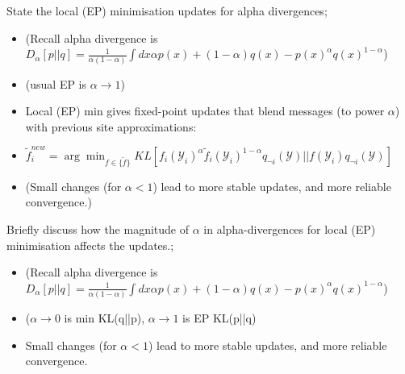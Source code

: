 \documentclass{article}
\begin{document}
State the local (EP) minimisation updates for alpha divergences; \begin{itemize}
    \item (Recall alpha divergence is $D_{\alpha}[p||q] = \frac{1}{\alpha(1-\alpha)}\int dx \alpha p(x) + (1-\alpha)q(x) - p(x)^{\alpha}q(x)^{1-\alpha}$)
    \item (usual EP is $\alpha\rightarrow 1$)
    \item Local (EP) min gives fixed-point updates that blend messages (to power $\alpha$) with previous site approximations:
    \item $\tilde{f}^{new}_i = \arg\min_{f \in \{\tilde{f}\}} KL[f_i(\mathcal{Y}_i)^{\alpha}\tilde{f}_i(\mathcal{Y}_i)^{1-\alpha}q_{\neg i}(\mathcal{Y})||f(\mathcal{Y}_i)q_{\neg i}(\mathcal{Y})]$
    \item (Small changes (for $\alpha < 1$) lead to more stable updates, and more reliable convergence.)
\end{itemize}

Briefly discuss how the magnitude of $\alpha$ in alpha-divergences for local (EP) minimisation affects the updates.; \begin{itemize}
    \item (Recall alpha divergence is $D_{\alpha}[p||q] = \frac{1}{\alpha(1-\alpha)}\int dx \alpha p(x) + (1-\alpha)q(x) - p(x)^{\alpha}q(x)^{1-\alpha}$)
    \item ($\alpha\rightarrow 0$ is min KL(q||p), $\alpha\rightarrow 1$ is EP KL(p||q)
    \item Small changes (for $\alpha < 1$) lead to more stable updates, and more reliable convergence.
\end{itemize}
\end{document}
